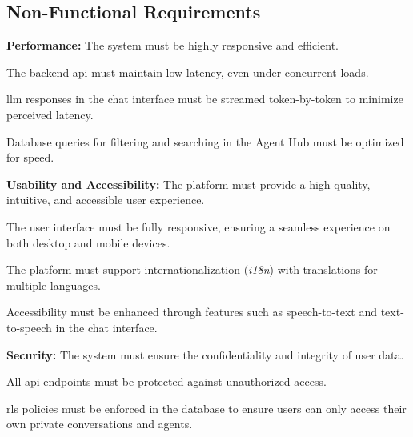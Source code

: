 \subsection{Non-Functional Requirements}
\begin{nonfunctionalmod}[PERF]
    \item \textbf{Performance:} The system must be highly responsive and efficient.
    \begin{nonfunctionalmod}
        \item The backend \acs{api} must maintain low latency, even under concurrent loads.
        \item \Ac{llm} responses in the chat interface must be streamed token-by-token to minimize perceived latency.
        \item Database queries for filtering and searching in the Agent Hub must be optimized for speed.
    \end{nonfunctionalmod}
\end{nonfunctionalmod}

\begin{nonfunctionalmod}[USABIL]
    \item \textbf{Usability and Accessibility:} The platform must provide a high-quality, intuitive, and accessible user experience.
    \begin{nonfunctionalmod}
        \item The user interface must be fully responsive, ensuring a seamless experience on both desktop and mobile devices.
        \item The platform must support internationalization (\textit{i18n}) with translations for multiple languages.
        \item Accessibility must be enhanced through features such as speech-to-text and text-to-speech in the chat interface.
    \end{nonfunctionalmod}
\end{nonfunctionalmod}

\begin{nonfunctionalmod}[SEC]
    \item \textbf{Security:} The system must ensure the confidentiality and integrity of user data.
    \begin{nonfunctionalmod}
        \item All \acs{api} endpoints must be protected against unauthorized access.
        \item  \ac{rls} policies must be enforced in the database to ensure users can only access their own private conversations and agents.
    \end{nonfunctionalmod}
\end{nonfunctionalmod}

